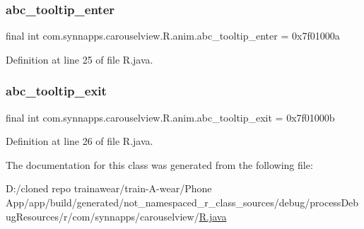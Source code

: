 \subsubsection{\texorpdfstring{abc\_tooltip\_enter}{abc\_tooltip\_enter}}
{\footnotesize\ttfamily final int com.\+synnapps.\+carouselview.\+R.\+anim.\+abc\+\_\+tooltip\+\_\+enter = 0x7f01000a\hspace{0.3cm}{\ttfamily [static]}}



Definition at line 25 of file R.\+java.

\mbox{\label{classcom_1_1synnapps_1_1carouselview_1_1_r_1_1anim_a7a33a5e2bc46edc4c3a9b3824929ea03}} 
\subsubsection{\texorpdfstring{abc\_tooltip\_exit}{abc\_tooltip\_exit}}
{\footnotesize\ttfamily final int com.\+synnapps.\+carouselview.\+R.\+anim.\+abc\+\_\+tooltip\+\_\+exit = 0x7f01000b\hspace{0.3cm}{\ttfamily [static]}}



Definition at line 26 of file R.\+java.



The documentation for this class was generated from the following file\+:\begin{DoxyCompactItemize}
\item 
D\+:/cloned repo trainawear/train-\/\+A-\/wear/\+Phone App/app/build/generated/not\+\_\+namespaced\+\_\+r\+\_\+class\+\_\+sources/debug/process\+Debug\+Resources/r/com/synnapps/carouselview/\mbox{\hyperlink{process_debug_resources_2r_2com_2synnapps_2carouselview_2_r_8java}{R.\+java}}\end{DoxyCompactItemize}
